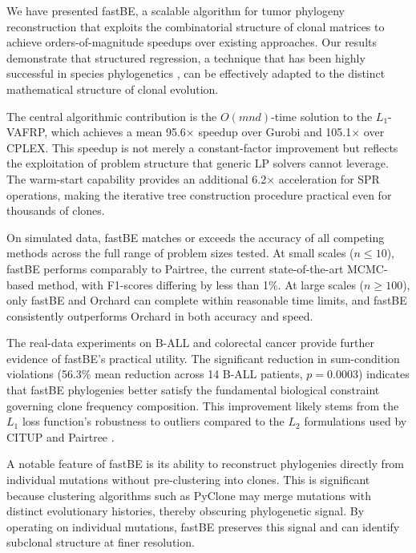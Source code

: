 \documentclass[11pt]{article}
\begin{document}
We have presented fastBE, a scalable algorithm for tumor phylogeny reconstruction that exploits the combinatorial structure of clonal matrices to achieve orders-of-magnitude speedups over existing approaches. Our results demonstrate that structured regression, a technique that has been highly successful in species phylogenetics \citep{desper2002fastme, price2010fasttree}, can be effectively adapted to the distinct mathematical structure of clonal evolution.

The central algorithmic contribution is the $O(mnd)$-time solution to the $L_1$-VAFRP, which achieves a mean 95.6$\times$ speedup over Gurobi and 105.1$\times$ over CPLEX. This speedup is not merely a constant-factor improvement but reflects the exploitation of problem structure that generic LP solvers cannot leverage. The warm-start capability provides an additional 6.2$\times$ acceleration for SPR operations, making the iterative tree construction procedure practical even for thousands of clones.

On simulated data, fastBE matches or exceeds the accuracy of all competing methods across the full range of problem sizes tested. At small scales ($n \leq 10$), fastBE performs comparably to Pairtree, the current state-of-the-art MCMC-based method, with F1-scores differing by less than 1\%. At large scales ($n \geq 100$), only fastBE and Orchard can complete within reasonable time limits, and fastBE consistently outperforms Orchard in both accuracy and speed.

The real-data experiments on B-ALL and colorectal cancer provide further evidence of fastBE's practical utility. The significant reduction in sum-condition violations (56.3\% mean reduction across 14 B-ALL patients, $p = 0.0003$) indicates that fastBE phylogenies better satisfy the fundamental biological constraint governing clone frequency composition. This improvement likely stems from the $L_1$ loss function's robustness to outliers compared to the $L_2$ formulations used by CITUP and Pairtree \citep{el2005citup, wintersinger2022pairtree}.

A notable feature of fastBE is its ability to reconstruct phylogenies directly from individual mutations without pre-clustering into clones. This is significant because clustering algorithms such as PyClone \citep{roth2014pyclone} may merge mutations with distinct evolutionary histories, thereby obscuring phylogenetic signal. By operating on individual mutations, fastBE preserves this signal and can identify subclonal structure at finer resolution.
\end{document}

